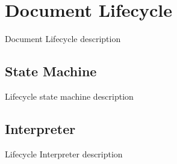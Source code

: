 \newpage
\section{Document Lifecycle}
Document Lifecycle description

\subsection{State Machine}
Lifecycle state machine description

\subsection{Interpreter}
Lifecycle Interpreter description
